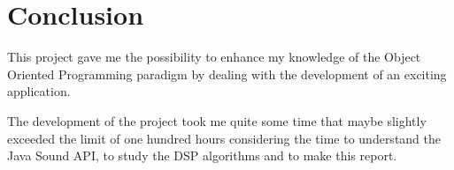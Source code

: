 \chapter{Conclusion}
This project gave me the possibility to enhance my knowledge of the
Object Oriented Programming paradigm by dealing with the development of
an exciting application.

The development of the project took me quite some time that maybe
slightly exceeded the limit of one hundred hours considering the time
to understand the Java Sound API, to study the DSP algorithms and to
make this report.
